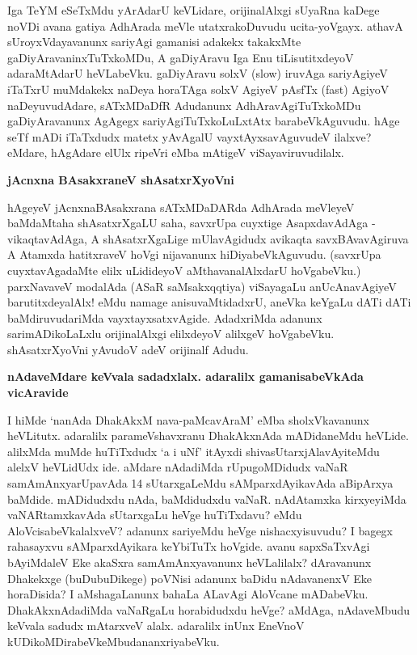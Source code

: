 Iga TeYM eSeTxMdu yArAdarU keVLidare, orijinalAlxgi sUyaRna kaDege noVDi avana gatiya AdhArada meVle utatxrakoDuvudu ucita-yoVgayx. athavA sUroyxVdayavanunx sariyAgi gama\-nisi adakekx takakxMte gaDiyAravaninxTuTxkoMDu, A gaDi\-yAravu Iga Enu tiLisutitxdeyoV adaraMtA\-darU heVLabeVku. gaDi\-yAravu solxV {\rm (slow)} iruvAga sariyAgiyeV iTaTxrU muMdakekx naDeya horaTAga solxV AgiyeV pAsfTx {\rm (fast)} AgiyoV  naDeyuvudAdare, sATxMDaDfR Adudanunx AdhAravAgiTuTxkoMDu gaDiyAra\-vanunx AgAgegx sariyAgiTuTxkoLuLxtAtx barabeVkAguvudu. hAge seTf mADi iTaTxdudx matetx yAvAgalU vayxtAyxsa\-vAgu\-vudeV ilalxve? eMdare, hAgAdare elUlx ripeVri eMba mAtigeV viSayaviruvudilalx.

{\bigskip
\noindent
{\large\bf jAcnxna BAsakxraneV shAsatxrXyoVni}}\label{page168}
\medskip

\noindent
hAgeyeV jAcnxnaBAsakxrana sATxMDaDARda AdhArada meVleyeV baMdaMtaha shAsatxrXgaLU saha, savxrUpa cuyxtige AsapxdavAdAga - vikaqtavAdAga, A shAsatxrXgaLige mUlavAgidudx avikaqta savxBAvavAgiruva A Atamxda hatitxraveV hoVgi nijavanunx hiDiyabeVkAguvudu. (savxrUpa cuyxtavAgadaMte elilx uLidideyoV aMthava\-nalAlxdarU hoVgabeVku.) parxNavaveV modalAda (ASaR saMsakxqqtiya) viSayagaLu anUcAna\-vAgiyeV barutitxdeyalAlx! eMdu namage anisuvaMtidadxrU, aneVka keYgaLu dATi dATi baMdiruvuda\-riMda vayxtayxsatx\-vAgide. AdadxriMda adanunx sarimADikoLaLxlu orijinalAlxgi elilxdeyoV alilxgeV hoVgabeVku. shAsatxrX\-yoVni yAvudoV adeV orijinalf Adudu.

{\bigskip
\noindent
{\large\bf nAdaveMdare keVvala sadadxlalx. adaralilx gamanisabeVkAda vicAravide}}\label{page169}
\medskip

\noindent
I hiMde `nanAda DhakAkxM nava-paMcavAraM' eMba sholxVkavanunx heVLitutx. adaralilx parameVshavxranu DhakAkxnAda mADidaneMdu heVLide. alilxMda muMde huTiTxdudx `a i uNf' itAyxdi shivasUtarxjAlavAyi\-teMdu alelxV heVLidUdx ide. aMdare nAdadiMda rUpugoMDidudx vaNaR samAmAnxyarUpavAda 14 sUtarx\-gaLeMdu sAMparxdAyikavAda aBipArxya baMdide. mADidudxdu nAda, baMdidudxdu vaNaR. nAdA\-tamxka kirxyeyiMda vaNARtamxkavAda sUtarxgaLu heVge huTiTxdavu? eMdu AloVcisabeVkalalxveV? adanunx sari\-yeMdu heVge nishacxyisuvudu? I bagegx rahasayxvu sAMparxdAyikara keYbiTuTx hoVgide. avanu sapxSaTxvAgi bAyiM\-daleV Eke akaSxra samAmAnxyavanunx heVLalilalx? dAravanunx Dhakekxge (buDubuDikege) poVNisi adanunx baDidu nAdavanenxV Eke horaDisida? I aMshagaLanunx bahaLa ALavAgi AloVcane mADabeVku. DhakAkx\-nAdadiMda vaNaRgaLu horabidudxdu heVge? aMdAga, nAdaveMbudu keVvala sadudx mAtarxveV alalx. adaralilx inUnx EneVnoV kUDikoMDirabeVkeMbudananxriyabeVku.

